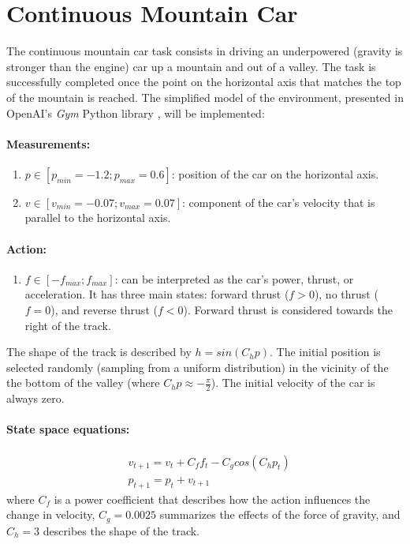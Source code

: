 \documentclass{article}
\begin{document}
\section{Continuous Mountain Car}
The continuous mountain car task consists in driving an underpowered (gravity is stronger than the engine) car up a mountain and out of a valley. The task is successfully completed once the point on the horizontal axis that matches the top of the mountain is reached. The simplified model of the environment, presented in OpenAI's \emph{Gym} Python library \cite{Brockman2016}, will be implemented:

\paragraph{Measurements:}

\begin{enumerate}
\item $p \in [p_{min} = -1.2; p_{max} = 0.6] $: position of the car on the horizontal axis.
\item $v \in [v_{min} = -0.07; v_{max} = 0.07] $: component of the car's velocity that is parallel to the horizontal axis.
\end{enumerate}

\paragraph{Action:}

\begin{enumerate}
\item $f \in [-f_{max}; f_{max}] $: can be interpreted as the car's power, thrust, or acceleration. It has three main states: forward thrust ($f > 0$), no thrust ($f = 0$), and reverse thrust ($f < 0$). Forward thrust is considered towards the right of the track.
\end{enumerate}

The shape of the track is described by $h = sin(C_h p)$. The initial position is selected randomly (sampling from a uniform distribution) in the vicinity of the the bottom of the valley (where $C_h p \approx -\frac{\pi}{2}$). The initial velocity of the car is always zero.

\paragraph{State space equations:}

\begin{equation}
\begin{aligned}
&v_{t+1} = v_t + C_f f_t - C_g cos(C_h p_t)\\
&p_{t+1} = p_t + v_{t+1}
\end{aligned}
\end{equation}
where $C_f$ is a power coefficient that describes how the action influences the change in velocity, $C_g = 0.0025$ summarizes the effects of the force of gravity, and $C_h = 3$ describes the shape of the track.
\end{document}
